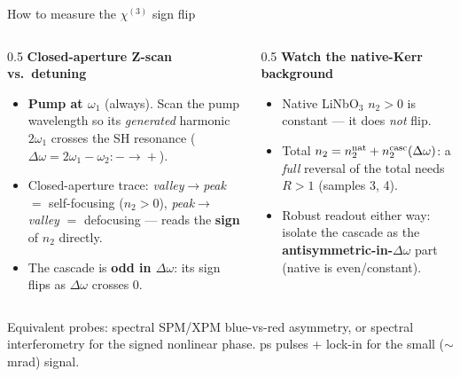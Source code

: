 \documentclass[aspectratio=169,11pt]{beamer}
\newcommand{\chithree}{\chi^{(3)}}
\newcommand{\Dom}{\Delta\omega}
\begin{document}
\begin{frame}{How to measure the $\chithree$ sign flip}
  \begin{columns}[T]
    \begin{column}{0.5\textwidth}\small
      \textbf{Closed-aperture Z-scan vs.\ detuning}
      \begin{itemize}
        \item \textbf{Pump at $\omega_1$} (always). Scan the pump wavelength so its
              \emph{generated} harmonic $2\omega_1$ crosses the SH resonance
              ($\Dom=2\omega_1-\omega_2:-\!\to\!+$).
        \item Closed-aperture trace: \emph{valley$\to$peak} $=$ self-focusing
              ($n_2\!>\!0$), \emph{peak$\to$valley} $=$ defocusing --- reads the
              \textbf{sign} of $n_2$ directly.
        \item The cascade is \textbf{odd in $\Dom$}: its sign flips as $\Dom$ crosses $0$.
      \end{itemize}
    \end{column}
    \begin{column}{0.5\textwidth}\small
      \textbf{Watch the native-Kerr background}
      \begin{itemize}
        \item Native LiNbO$_3$ $n_2>0$ is constant --- it does \emph{not} flip.
        \item Total $n_2=n_2^{\rm nat}+n_2^{\rm casc}(\Dom)$: a \emph{full} reversal of
              the total needs $R>1$ (samples 3, 4).
        \item Robust readout either way: isolate the cascade as the
              \textbf{antisymmetric-in-$\Dom$} part (native is even/constant).
      \end{itemize}
    \end{column}
  \end{columns}
  \vspace{3pt}
  \footnotesize Equivalent probes: spectral SPM/XPM blue-vs-red asymmetry, or spectral
  interferometry for the signed nonlinear phase. ps pulses + lock-in for the small ($\sim$mrad) signal.
\end{frame}
\end{document}
